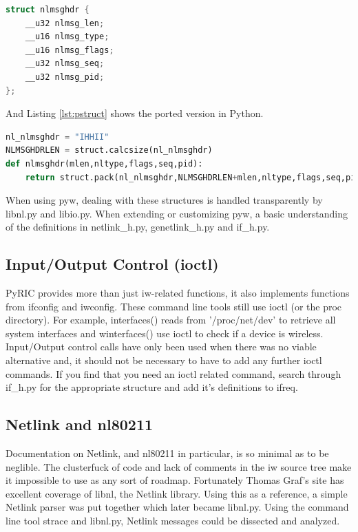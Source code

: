 \documentclass[11pt]{article}
\begin{document}
\begin{lstlisting}[caption={C Struct nlmsghdr},
                   label={lst:cstruct},
                   language=C]
struct nlmsghdr {
    __u32 nlmsg_len;
    __u16 nlmsg_type;
    __u16 nlmsg_flags;
    __u32 nlmsg_seq;
    __u32 nlmsg_pid;
};
\end{lstlisting}

And Listing \ref{lst:pstruct} shows the ported version in Python.

\begin{lstlisting}[caption={Corresponding Python Definition},
                   label={lst:pstruct},
                   language=Python]
nl_nlmsghdr = "IHHII"
NLMSGHDRLEN = struct.calcsize(nl_nlmsghdr)
def nlmsghdr(mlen,nltype,flags,seq,pid):
    return struct.pack(nl_nlmsghdr,NLMSGHDRLEN+mlen,nltype,flags,seq,pid)
\end{lstlisting}

When using pyw, dealing with these structures is handled transparently by libnl.py 
and libio.py. When extending or customizing pyw, a basic understanding of the 
definitions in netlink\_h.py, genetlink\_h.py and if\_h.py.

\subsection{Input/Output Control (ioctl)}
PyRIC provides more than just iw-related functions, it also implements functions
from ifconfig and iwconfig. These command line tools still use ioctl (or the proc
directory). For example, interfaces() reads from '/proc/net/dev' to retrieve all
system interfaces and winterfaces() use ioctl to check if a device is wireless.
Input/Output control calls have only been used when there was no viable alternative 
and, it should not be necessary to have to add any further ioctl commands. If you
find that you need an ioctl related command, search through if\_h.py for the 
appropriate structure and add it's definitions to ifreq. 

\subsection{Netlink and nl80211}
Documentation on Netlink, and nl80211 in particular, is so minimal as to be 
neglible. The clusterfuck of code and lack of comments in the iw source tree 
make it impossible to use as any sort of roadmap. Fortunately Thomas Graf's 
site\cite{libnl} has excellent coverage of libnl, the Netlink library. Using 
this as a reference, a simple Netlink parser was put together which later became
libnl.py. Using the command line tool strace and libnl.py, Netlink messages could
be dissected and analyzed.\\
\end{document}
